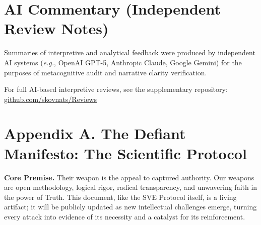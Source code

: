 \documentclass[11pt,a4paper]{article}
\begin{document}
\section*{AI Commentary (Independent Review Notes)}
Summaries of interpretive and analytical feedback were produced by independent AI systems 
(\textit{e.g.}, OpenAI GPT-5, Anthropic Claude, Google Gemini) 
for the purposes of metacognitive audit and narrative clarity verification.  

For full AI-based interpretive reviews, see the supplementary repository:  
\href{https://codeberg.org/skovnats/SVE-Systemic-Verification-Engineering/tree/master/Reviews}{github.com/skovnats/Reviews}





\clearpage %
\appendix



\section*{Appendix A. The Defiant Manifesto: The Scientific Protocol}
\label{app:manifesto}

\vspace{1em}

\noindent{}

\vspace{1.5em}

\noindent\textbf{\textcolor{headercolor}{Core Premise.}} Their weapon is the appeal to captured authority. Our weapons are open methodology, logical rigor, radical transparency, and unwavering faith in the power of Truth. This document, like the SVE Protocol itself, is a living artifact; it will be publicly updated as new intellectual challenges emerge, turning every attack into evidence of its necessity and a catalyst for its reinforcement.
\end{document}
